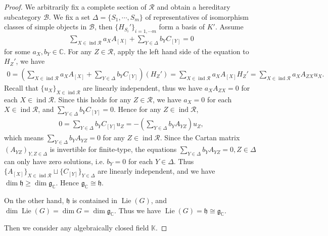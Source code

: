 \documentclass[12pt]{amsart}
\begin{document}
\begin{proof}
    We arbitrarily fix a complete section of $\mathcal{R}$ and obtain a hereditary subcategory $\mathcal{B}$. We fix a set $\Delta=\{S_1,\cdots,S_m\}$ of representatives of isomorphism classes of simple objects in $\mathcal{B}$, then $\{H_{S_i}'\}_{i=1,\cdots m}$ form a basis of $K'$.
    Assume 
    \begin{align*}
        \sum\limits_{X\in \operatorname{ind}\mathcal{R}} a_X A_{[X]}+\sum\limits_{Y\in \Delta}b_Y C_{[Y]} = 0
    \end{align*}
    for some $a_X,b_Y\in \mathbb{C}$.
    For any $Z\in \mathcal{R}$, apply the left hand side of the equation to $H_Z'$, we have 
    \begin{align*}
        0=( \sum\limits_{X\in \operatorname{ind}\mathcal{R}} a_X A_{[X]}+\sum\limits_{Y\in \Delta}b_Y C_{[Y]})(H_Z') = \sum\limits_{X\in \operatorname{ind}\mathcal{R}} a_X A_{[X]}H_Z' = \sum\limits_{X\in \operatorname{ind}\mathcal{R}} a_X A_{ZX} u_X.
    \end{align*}
    Recall that $\{u_X\}_{X\in \operatorname{ind}\mathcal{R}}$ are linearly independent, thus we have $a_XA_{ZX}=0$ for each $X\in \operatorname{ind}\mathcal{R}$.
    Since this holds for any $ Z\in \mathcal{R}$, we have $a_X=0$ for each $X\in \operatorname{ind}\mathcal{R}$, and $\sum\limits_{Y\in \Delta}b_Y C_{[Y]}=0$.
    Hence for any $Z\in \operatorname{ind}\mathcal{R}$, 
    \begin{align*}
        0=\sum\limits_{Y\in \Delta}b_Y C_{[Y]}u_Z = -(\sum\limits_{Y\in \Delta}b_Y A_{YZ})u_Z,
    \end{align*}
    which means $\sum\limits_{Y\in \Delta}b_Y A_{YZ}=0$ for any $Z\in \operatorname{ind}\mathcal{R}$.
    Since the Cartan matrix $(A_{YZ})_{Y,Z\in \Delta}$ is invertible for finite-type, the equations $\sum\limits_{Y\in \Delta}b_Y A_{YZ}=0,Z\in \Delta$ can only have zero solutions, i.e. $b_Y=0$ for each $Y\in \Delta$.
    Thus $\{A_{[X]}\}_{X\in \operatorname{ind}\mathcal{R}} \sqcup \{ C_{[Y]} \}_{Y\in \Delta}$ are linearly independent, and we have
 $       \operatorname{dim}\mathfrak{h} \geq \operatorname{dim}\mathfrak{g}_{\mathbb{C}} $.
 Hence $\mathfrak{g}_{\mathbb{C}}\cong \mathfrak{h}$.
 
 On the other hand, $\mathfrak{h}$ is contained in $\operatorname{Lie}(G)$, and $ \operatorname{dim} \operatorname{Lie}(G) =\operatorname{dim} G = \operatorname{dim} \mathfrak{g}_{\mathbb{C}}$.
 Thus we have $\operatorname{Lie}(G)=\mathfrak{h}\cong \mathfrak{g}_{\mathbb{C}}$.
    

 Then we consider any algebraically closed field $\mathbb{K}$.


\end{proof}
\end{document}
